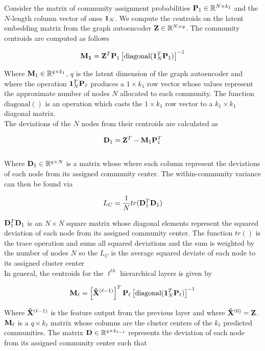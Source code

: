 \documentclass[a4paper,12pt]{article}
\begin{document}
\begin{itemize}
\begin{enumerate}
{{\begin{enumerate}
{					Consider the matrix of community assignment probabilities ${\bf P}_1\in \mathbb{R}^{N\times k_1}$ and the $N$-length column vector of ones ${\bf 1}_N$. We compute the centroids on the latent embedding matrix from the graph autoencoder ${\bf Z}\in \mathbb{R}^{N\times q}$. The community centroids are computed as follows
					
					\[ {\bf M_1} = {\bf Z}^T{\bf P}_1 \left[\text{diagonal}({\bf 1}_N^T {\bf P}_1)\right]^{-1}\]
					
					Where ${\bf M}_1 \in \mathbb{R}^{q\times k_1}$, $q$ is the latent dimension of the graph autoencoder and where the operation ${\bf 1}_N^T {\bf P}_1$ produces a $1 \times k_1$ row vector whose values represent the approximate number of nodes $N$ allocated to each community. The function $\text{diagonal}()$ is an operation which casts the $1 \times k_1$ row vector to a $k_1 \times k_1$ diagonal matrix. \\
					
					The deviations of the $N$ nodes from their centroids are calculated as 
					
					\[ {\bf D}_1 ={\bf Z}^T - {\bf M}_1{\bf P}_1^T \]\\
					
					Where ${\bf D}_1\in \mathbb{R}^{q\times N}$ is a matrix whose where each column represent the deviations of each node from its assigned community center. The within-community variance can then be found via
					
					\[L_C = \frac{1}{N} tr({\bf D}_1^T {\bf D}_1)\]
					
					${\bf D}_1^T {\bf D}_1$ is an $N\times N$ square matrix whose diagonal elements represent the squared deviation of each node from its assigned community center. The function $tr()$ is the trace operation and sums all squared deviations and the sum is weighted by the number of nodes $N$ so the $L_C$ is the average squared deviate of each node to its assigned cluster center\\
					
					In general, the centroids for the $\ell^{th}$ hierarchical layers is given by
					
					\[ {\bf M_\ell} = \left[{\bf \tilde X}^{(\ell-1)}\right]^T{\bf P}_\ell \left[\text{diagonal}({\bf 1}_N^T {\bf P}_\ell)\right]^{-1}\]
					
					Where ${\bf \tilde X}^{(\ell-1)}$ is the feature output from the previous layer and where ${\bf \tilde X}^{(0)} = {\bf Z}$. $\bf M_\ell$ is a $q\times k_\ell$ matrix whose columns are the cluster centers of the $k_\ell$ predicted communities. The matrix ${\bf D}\in\mathbb{R}^{q\times k_{\ell-1}}$ represents the deviation of each node from its assigned community center such that
					
}
\end{enumerate}}}
\end{enumerate}
\end{itemize}
\end{document}
